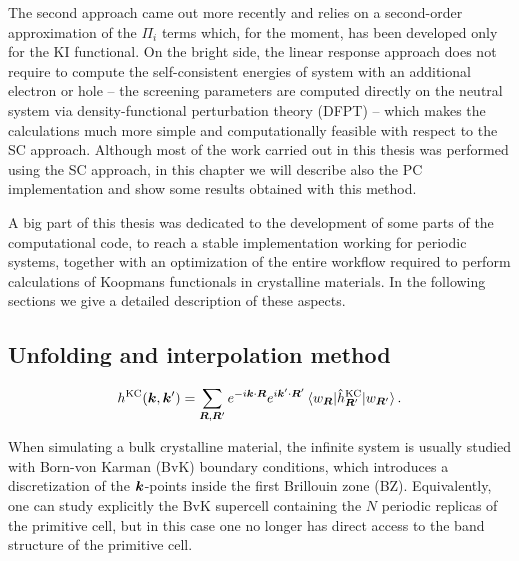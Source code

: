 The second approach came out more recently \cite{colonna_koopmans_2022} and relies on a second-order approximation of the $\Pi_i$ terms which, for the moment, has been developed only for the KI functional. On the bright side, the linear response approach does not require to compute the self-consistent energies of system with an additional electron or hole -- the screening parameters are computed directly on the neutral system via density-functional perturbation theory (DFPT) -- which makes the calculations much more simple and computationally feasible with respect to the SC approach. Although most of the work carried out in this thesis was performed using the SC approach, in this chapter we will describe also the PC implementation and show some results obtained with this method.

A big part of this thesis was dedicated to the development of some parts of the computational code, to reach a stable implementation working for periodic systems, together with an optimization of the entire workflow required to perform calculations of Koopmans functionals in crystalline materials. In the following sections we give a detailed description of these aspects.


\subsection{Unfolding and interpolation method\label{sec:unfolding-method}}

\begin{equation}
    h^{\rm KC}({\bm k},{\bm k}') = \sum_{{\bm R},{\bm R}'} e^{-i{\bm k} \cdot {\bm R}} e^{i{\bm k}' \cdot {\bm R}'} \braket{w_{{\bm R}} | \hat{h}^{\rm KC}_{{\bm R}'} | w_{{\bm R}'}} .
    \label{eq:double-k-ham}
\end{equation}

When simulating a bulk crystalline material, the infinite system is usually studied with Born-von Karman (BvK) boundary conditions, which introduces a discretization of the ${\bm k}$-points inside the first Brillouin zone (BZ). Equivalently, one can study explicitly the BvK supercell containing the $N$ periodic replicas of the primitive cell, but in this case one no longer has direct access to the band structure of the primitive cell.

